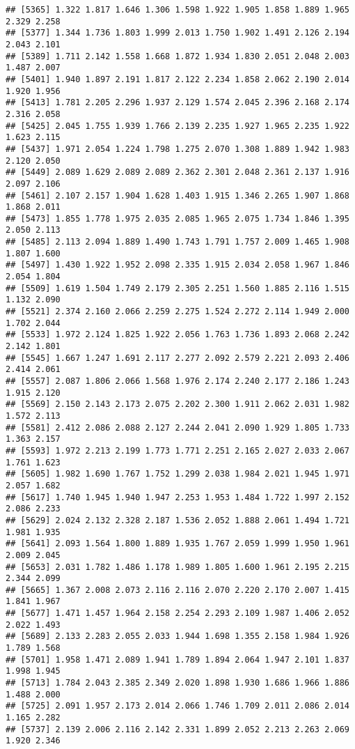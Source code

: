 \documentclass[
]{article}
\begin{document}
\begin{verbatim}
## [5365] 1.322 1.817 1.646 1.306 1.598 1.922 1.905 1.858 1.889 1.965 2.329 2.258
## [5377] 1.344 1.736 1.803 1.999 2.013 1.750 1.902 1.491 2.126 2.194 2.043 2.101
## [5389] 1.711 2.142 1.558 1.668 1.872 1.934 1.830 2.051 2.048 2.003 1.487 2.007
## [5401] 1.940 1.897 2.191 1.817 2.122 2.234 1.858 2.062 2.190 2.014 1.920 1.956
## [5413] 1.781 2.205 2.296 1.937 2.129 1.574 2.045 2.396 2.168 2.174 2.316 2.058
## [5425] 2.045 1.755 1.939 1.766 2.139 2.235 1.927 1.965 2.235 1.922 1.623 2.115
## [5437] 1.971 2.054 1.224 1.798 1.275 2.070 1.308 1.889 1.942 1.983 2.120 2.050
## [5449] 2.089 1.629 2.089 2.089 2.362 2.301 2.048 2.361 2.137 1.916 2.097 2.106
## [5461] 2.107 2.157 1.904 1.628 1.403 1.915 1.346 2.265 1.907 1.868 1.868 2.011
## [5473] 1.855 1.778 1.975 2.035 2.085 1.965 2.075 1.734 1.846 1.395 2.050 2.113
## [5485] 2.113 2.094 1.889 1.490 1.743 1.791 1.757 2.009 1.465 1.908 1.807 1.600
## [5497] 1.430 1.922 1.952 2.098 2.335 1.915 2.034 2.058 1.967 1.846 2.054 1.804
## [5509] 1.619 1.504 1.749 2.179 2.305 2.251 1.560 1.885 2.116 1.515 1.132 2.090
## [5521] 2.374 2.160 2.066 2.259 2.275 1.524 2.272 2.114 1.949 2.000 1.702 2.044
## [5533] 1.972 2.124 1.825 1.922 2.056 1.763 1.736 1.893 2.068 2.242 2.142 1.801
## [5545] 1.667 1.247 1.691 2.117 2.277 2.092 2.579 2.221 2.093 2.406 2.414 2.061
## [5557] 2.087 1.806 2.066 1.568 1.976 2.174 2.240 2.177 2.186 1.243 1.915 2.120
## [5569] 2.150 2.143 2.173 2.075 2.202 2.300 1.911 2.062 2.031 1.982 1.572 2.113
## [5581] 2.412 2.086 2.088 2.127 2.244 2.041 2.090 1.929 1.805 1.733 1.363 2.157
## [5593] 1.972 2.213 2.199 1.773 1.771 2.251 2.165 2.027 2.033 2.067 1.761 1.623
## [5605] 1.982 1.690 1.767 1.752 1.299 2.038 1.984 2.021 1.945 1.971 2.057 1.682
## [5617] 1.740 1.945 1.940 1.947 2.253 1.953 1.484 1.722 1.997 2.152 2.086 2.233
## [5629] 2.024 2.132 2.328 2.187 1.536 2.052 1.888 2.061 1.494 1.721 1.981 1.935
## [5641] 2.093 1.564 1.800 1.889 1.935 1.767 2.059 1.999 1.950 1.961 2.009 2.045
## [5653] 2.031 1.782 1.486 1.178 1.989 1.805 1.600 1.961 2.195 2.215 2.344 2.099
## [5665] 1.367 2.008 2.073 2.116 2.116 2.070 2.220 2.170 2.007 1.415 1.841 1.967
## [5677] 1.471 1.457 1.964 2.158 2.254 2.293 2.109 1.987 1.406 2.052 2.022 1.493
## [5689] 2.133 2.283 2.055 2.033 1.944 1.698 1.355 2.158 1.984 1.926 1.789 1.568
## [5701] 1.958 1.471 2.089 1.941 1.789 1.894 2.064 1.947 2.101 1.837 1.998 1.945
## [5713] 1.784 2.043 2.385 2.349 2.020 1.898 1.930 1.686 1.966 1.886 1.488 2.000
## [5725] 2.091 1.957 2.173 2.014 2.066 1.746 1.709 2.011 2.086 2.014 1.165 2.282
## [5737] 2.139 2.006 2.116 2.142 2.331 1.899 2.052 2.213 2.263 2.069 1.920 2.346

\end{verbatim}
\end{document}
